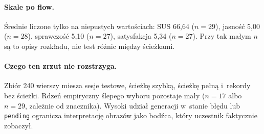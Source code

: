 \paragraph{Skale po flow.}
Średnie liczone tylko na niepustych wartościach: SUS 66,64 ($n=29$), jasność 5,00 ($n=28$), sprawczość 5,10 ($n=27$), satysfakcja 5,34 ($n=27$). Przy tak małym $n$ są to opisy rozkładu, nie test różnic między ścieżkami.

\paragraph{Czego ten zrzut nie rozstrzyga.}
Zbiór 240 wierszy miesza sesje testowe, ścieżkę szybką, ścieżkę pełną i~rekordy bez ścieżki. Rdzeń empiryczny ślepego wyboru pozostaje mały ($n=17$ albo $n=29$, zależnie od znacznika). Wysoki udział generacji w~stanie błędu lub \texttt{pending} ogranicza interpretację obrazów jako bodźca, który uczestnik faktycznie zobaczył.
